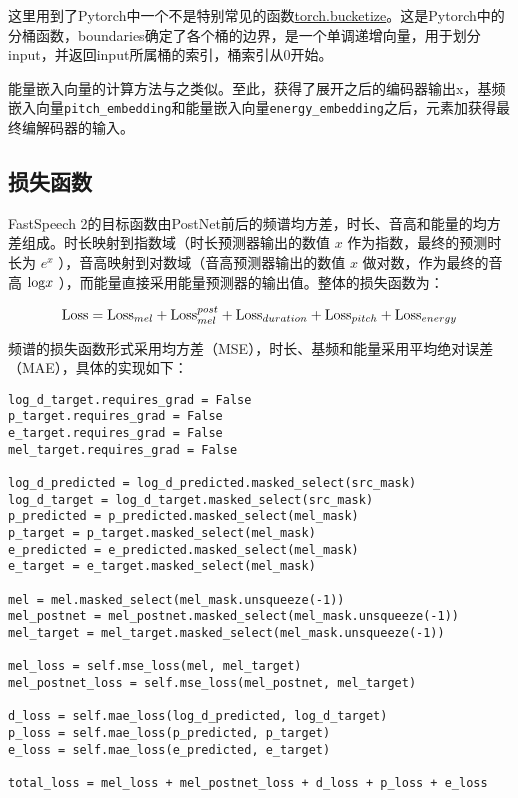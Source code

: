 \documentclass[cn,10pt,math=newtx,citestyle=gb7714-2015,bibstyle=gb7714-2015]{elegantbook}
\begin{document}
这里用到了Pytorch中一个不是特别常见的函数\href{https://pytorch.org/docs/master/generated/torch.bucketize.html}{torch.bucketize}。这是Pytorch中的分桶函数，boundaries确定了各个桶的边界，是一个单调递增向量，用于划分input，并返回input所属桶的索引，桶索引从0开始。

能量嵌入向量的计算方法与之类似。至此，获得了展开之后的编码器输出x，基频嵌入向量\lstinline{pitch_embedding}和能量嵌入向量\lstinline{energy_embedding}之后，元素加获得最终编解码器的输入。

\subsection{损失函数}

FastSpeech 2的目标函数由PostNet前后的频谱均方差，时长、音高和能量的均方差组成。时长映射到指数域（时长预测器输出的数值 $x$ 作为指数，最终的预测时长为 $e^x$ ），音高映射到对数域（音高预测器输出的数值 $x$ 做对数，作为最终的音高 ${\rm log} x$ ），而能量直接采用能量预测器的输出值。整体的损失函数为：

\begin{equation}
  {\rm Loss}={\rm Loss}_{mel}+{\rm Loss}_{mel}^{post}+{\rm Loss}_{duration}+{\rm Loss}_{pitch}+{\rm Loss}_{energy}
\end{equation}

频谱的损失函数形式采用均方差（MSE），时长、基频和能量采用平均绝对误差（MAE），具体的实现如下：

\begin{lstlisting}
log_d_target.requires_grad = False
p_target.requires_grad = False
e_target.requires_grad = False
mel_target.requires_grad = False

log_d_predicted = log_d_predicted.masked_select(src_mask)
log_d_target = log_d_target.masked_select(src_mask)
p_predicted = p_predicted.masked_select(mel_mask)
p_target = p_target.masked_select(mel_mask)
e_predicted = e_predicted.masked_select(mel_mask)
e_target = e_target.masked_select(mel_mask)

mel = mel.masked_select(mel_mask.unsqueeze(-1))
mel_postnet = mel_postnet.masked_select(mel_mask.unsqueeze(-1))
mel_target = mel_target.masked_select(mel_mask.unsqueeze(-1))

mel_loss = self.mse_loss(mel, mel_target)
mel_postnet_loss = self.mse_loss(mel_postnet, mel_target)

d_loss = self.mae_loss(log_d_predicted, log_d_target)
p_loss = self.mae_loss(p_predicted, p_target)
e_loss = self.mae_loss(e_predicted, e_target)

total_loss = mel_loss + mel_postnet_loss + d_loss + p_loss + e_loss
\end{lstlisting}
\end{document}
